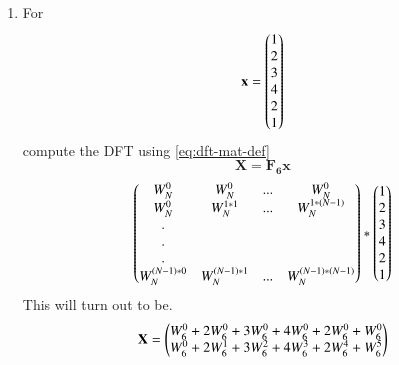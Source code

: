 \documentclass[journal,12pt,twocolumn]{IEEEtran}
\let\vec\mathbf
\renewcommand\thesection{\arabic{section}}
\begin{document}
\begin{enumerate}[label=\thesection.\arabic*]
\item For 
    \begin{align}
	    \vec{x} = \myvec{1\\2\\3\\4\\2\\1}
        \label{eq:equation1}
    \end{align}
    compute the DFT using 
	    \eqref{eq:dft-mat-def}
	\\\solution
		\begin{equation}
			\vec{X} = \vec{F_{6}}\vec{x}
		\end{equation}
		\begin{equation}
			\begin{pmatrix}
				W^{0}_{N} & W^{0}_{N} & ...& W^{0}_{N}\\
				W^{0}_{N} & W^{1    *1}_{N} & ...& W^{1*(N-1)}_{N}\\
				.\\
				.\\
				.\\
				W^{(N-1)*0}_{N} & W^{(N-1)*1}_{N} & ...& W^{(N-1)*(N-1)}_{N}\\
			\end{pmatrix}
			*
			\begin{pmatrix}
			1 \\ 2 \\ 3 \\ 4 \\ 2 \\ 1
			\end{pmatrix}
		\end{equation}
		This will turn out to be.
		\begin{equation}
			\vec{X} = 
			\myvec{
				W^{0}_{6} + 2W^{0}_{6} +  3W^{0}_{6} + 4W^{0}_{6} +  2W^{0}_{6} +  W^{0}_{6}\\
				W^{0}_{6} + 2W^{1}_{6} +  3W^{2}_{6} + 4W^{3}_{6} +  2W^{4}_{6} +  W^{5}_{6}\\
}
\end{equation}
\end{enumerate}
\end{document}

